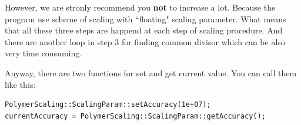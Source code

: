 \documentclass[12pt]{article}
\begin{document}
\begin{mySection}
However, we are stronly recommend you \textbf{not} to increase  a lot. Because the program use scheme of scaling with ``floating" scaling parameter. What means that all these three steps are happend at each step of scaling procedure. And there are another loop in step 3 for finding common divisor which can be also very time consuming.

Anyway, there are two functions for set and get current  value. You can call them like this:

\begin{lstlisting}
PolymerScaling::ScalingParam::setAccuracy(1e+07);
currentAccuracy = PolymerScaling::ScalingParam::getAccuracy();
\end{lstlisting}

\end{mySection}
\end{document}
